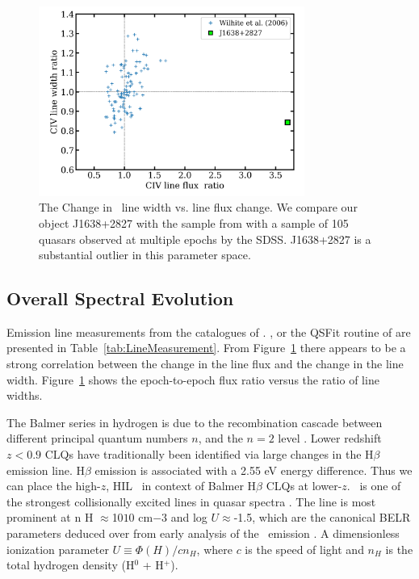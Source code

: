 \documentclass[a4paper,fleqn,usenatbib]{mnras}
\begin{document}
\begin{figure}
  \centering
  \includegraphics[width=8.7cm, trim=0.2cm 0.2cm 0.2cm 0.2cm, clip]
  {figures/Wilhite_2006_Fig2_redux_20190926.png}
   \vspace{-12pt}
  \caption[]{The Change in \civ\ line width vs. line flux change. 
We compare our object J1638+2827 with the sample 
from \citet{Wilhite2006} with a sample of 105 quasars observed at
multiple epochs by the SDSS. J1638+2827 is a substantial outlier 
in this parameter space.}
  \label{fig:Wilhite2006_comparison}
\end{figure}
\subsection{Overall Spectral Evolution}
Emission line measurements from the catalogues of  \citet{Shen2011}.
\citet{Hamann2017}, \citet{Kozlowski2017} or the QSFit routine of \citet{Calderone2017}
are presented in Table~\ref{tab:LineMeasurement}.
From Figure~\ref{fig:Wilhite2006_comparison} there appears to be a
strong correlation between the change in the line flux and the change
in the line width.  Figure~\ref{fig:Wilhite2006_comparison} shows the
epoch-to-epoch flux ratio versus the ratio of line widths.

The Balmer series in hydrogen is due to the recombination cascade
between different principal quantum numbers $n$, and
the $n=2$ level \citep[e.g., ][]{Seaton1959a, Seaton1959b}. 
Lower redshift $z<0.9$ CLQs have traditionally been identified via large changes in the
H$\beta$ emission line. H$\beta$ emission is associated with a 2.55 eV energy difference. 
Thus we can place the high-$z$, HIL \civ\ in context of Balmer H$\beta$ CLQs at lower-$z$. 
\civ\ is one of the strongest collisionally excited lines in quasar
spectra \citet[e.g.][]{HamannFerland1999}.  The line is most prominent
at n H $\approx$10$10$ cm$-3$ and log $U$$\approx$-1.5, which are the
canonical BELR parameters deduced over from early analysis of the
\civ\ emission \citep{Davidson_Netzer1979}.  A dimensionless
ionization parameter $U\equiv \Phi(H) / c n_{H}$, where $c$ is the
speed of light and $n_{H}$ is the total hydrogen density (H$^{0}$ +
H$^{+}$).
\end{document}
